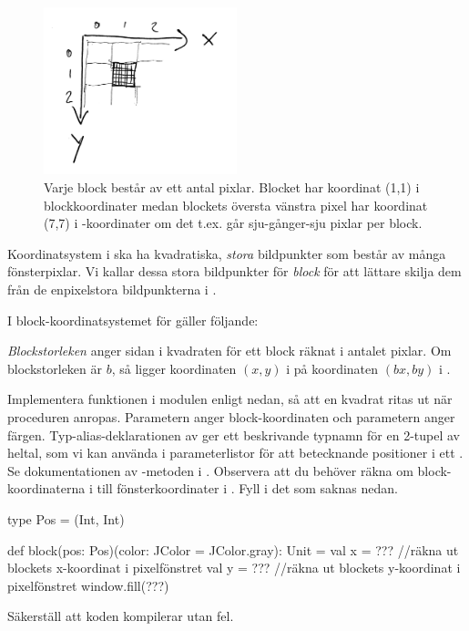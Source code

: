 \begin{figure}
\begin{center}
\includegraphics[width=0.5\textwidth]{../img/block-xy}
\end{center}
\caption{Varje block består av ett antal pixlar. Blocket har koordinat (1,1) i blockkoordinater medan blockets översta vänstra pixel har koordinat (7,7) i -koordinater om det t.ex. går sju-gånger-sju pixlar per block.}
\end{figure}

\Subtask
Koordinatsystem i  ska ha kvadratiska, \emph{stora} bildpunkter som består av många fönsterpixlar. 
Vi kallar dessa stora bildpunkter för \emph{block} för att lättare skilja dem från de enpixelstora bildpunkterna i . 

I block-koordinatsystemet för  gäller följande:

\begin{framed}
\noindent \emph{Blockstorleken} anger sidan i kvadraten för ett block räknat i antalet pixlar. Om blockstorleken är $b$, så ligger koordinaten $(x, y)$ i  på koordinaten $(bx, by)$ i .

\end{framed}

\noindent Implementera funktionen  i modulen  enligt nedan, så att en kvadrat ritas ut när proceduren anropas. Parametern  anger block-koordinaten och parametern  anger färgen. Typ-alias-deklarationen av  ger ett beskrivande typnamn för en 2-tupel av heltal, som vi kan använda i parameterlistor för att betecknande positioner i ett . Se dokumentationen av -metoden i . Observera att du behöver räkna om block-koordinaterna i  till fönsterkoordinater i . Fyll i det som saknas nedan.
\begin{Code}
  type Pos = (Int, Int)

  def block(pos: Pos)(color: JColor = JColor.gray): Unit = 
    val x = ??? //räkna ut blockets x-koordinat i pixelfönstret
    val y = ??? //räkna ut blockets y-koordinat i pixelfönstret
    window.fill(???)
\end{Code}
Säkerställ att koden kompilerar utan fel.

